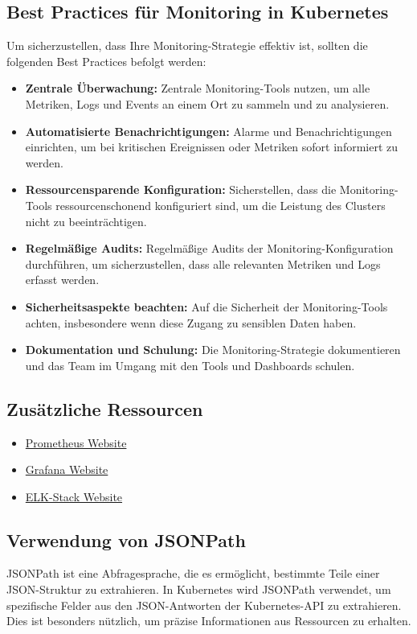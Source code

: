 \subsection{Best Practices für Monitoring in Kubernetes}
Um sicherzustellen, dass Ihre Monitoring-Strategie effektiv ist, sollten die folgenden Best Practices befolgt werden:
\begin{itemize}
  \item \textbf{Zentrale Überwachung:} Zentrale Monitoring-Tools nutzen, um alle Metriken, Logs und Events an einem Ort zu sammeln und zu analysieren.
  \item \textbf{Automatisierte Benachrichtigungen:} Alarme und Benachrichtigungen einrichten, um bei kritischen Ereignissen oder Metriken sofort informiert zu werden.
  \item \textbf{Ressourcensparende Konfiguration:} Sicherstellen, dass die Monitoring-Tools ressourcenschonend konfiguriert sind, um die Leistung des Clusters nicht zu beeinträchtigen.
  \item \textbf{Regelmäßige Audits:} Regelmäßige Audits der Monitoring-Konfiguration durchführen, um sicherzustellen, dass alle relevanten Metriken und Logs erfasst werden.
  \item \textbf{Sicherheitsaspekte beachten:} Auf die Sicherheit der Monitoring-Tools achten, insbesondere wenn diese Zugang zu sensiblen Daten haben.
  \item \textbf{Dokumentation und Schulung:} Die Monitoring-Strategie dokumentieren und das Team im Umgang mit den Tools und Dashboards schulen.
\end{itemize}

\subsection{Zusätzliche Ressourcen}
\begin{itemize}
  \item \href{https://prometheus.io/}{Prometheus Website}
  \item \href{https://grafana.com/}{Grafana Website}
  \item \href{https://www.elastic.co/elk-stack}{ELK-Stack Website}
\end{itemize}
\newpage
\subsection{Verwendung von JSONPath}
\label{subsec:use-json-path}
JSONPath ist eine Abfragesprache, die es ermöglicht, bestimmte Teile einer JSON-Struktur zu extrahieren. In Kubernetes wird JSONPath verwendet, um spezifische Felder aus den JSON-Antworten der Kubernetes-API zu extrahieren. Dies ist besonders nützlich, um präzise Informationen aus Ressourcen zu erhalten.

